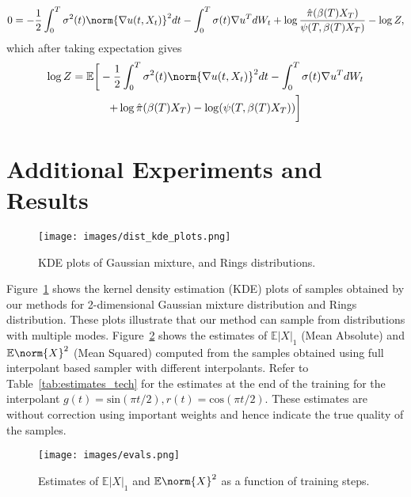 \begin{equation*}
0 = -\frac{1}{2}\int_0^T\sigma^2(t)\norm{\nabla u(t,X_t)}^2dt-\int_0^T\sigma(t)\nabla u^TdW_t + \log\frac{\hat{\pi}(\beta(T)X_T)}{\psi(T,\beta(T)X_T)} - \log Z,
\end{equation*}
which after taking expectation gives
\begin{multline}
    \log Z = \mathbb{E}\bigg[-\frac{1}{2}\int_0^T\sigma^2(t)\norm{\nabla u(t,X_t)}^2dt-\int_0^T\sigma(t)\nabla u^TdW_t\\ +\log\hat{\pi}(\beta(T)X_T)-\log(\psi(T,\beta(T)X_T))\bigg]
\end{multline}

\section{Additional Experiments and Results}\label{apndx:additionalExps}
\begin{figure}
  \centering
  \texttt{[image: images/dist\_kde\_plots.png]}
  \caption{KDE plots of Gaussian mixture, and Rings distributions.}
  \label{fig:kde_plots_tech}
\end{figure}
Figure~\ref{fig:kde_plots_tech} shows the kernel density estimation (KDE) plots of samples obtained by our methods for 2-dimensional Gaussian mixture distribution and Rings distribution. These plots illustrate that our method can sample from distributions with multiple modes. 
Figure~\ref{fig:estimates_functionals} shows the estimates of $\mathbb{E}|X|_1$ (Mean Absolute) and $\mathbb{E} \norm{X}^2$ (Mean Squared) computed from the samples obtained using full interpolant based sampler with different interpolants. Refer to Table~\ref{tab:estimates_tech} for the estimates at the end of the training for the interpolant $g(t)=\text{sin}(\pi t/2), r(t)=\text{cos}(\pi t/2)$. These estimates are without correction using important weights and hence indicate the true quality of the samples.
\begin{figure}
  \centering
  \texttt{[image: images/evals.png]}
  \caption{Estimates of $\mathbb{E}|X|_1$ and $\mathbb{E}\norm{X}^2$ as a function of training steps.}
  \label{fig:estimates_functionals}
\end{figure}

